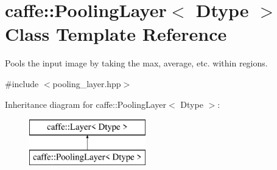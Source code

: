 \hypertarget{classcaffe_1_1PoolingLayer}{}\section{caffe\+:\+:Pooling\+Layer$<$ Dtype $>$ Class Template Reference}
\label{classcaffe_1_1PoolingLayer}


Pools the input image by taking the max, average, etc. within regions.  




{\ttfamily \#include $<$pooling\+\_\+layer.\+hpp$>$}

Inheritance diagram for caffe\+:\+:Pooling\+Layer$<$ Dtype $>$\+:\begin{figure}[H]
\begin{center}
\leavevmode
\includegraphics[height=2.000000cm]{classcaffe_1_1PoolingLayer}
\end{center}
\end{figure}
